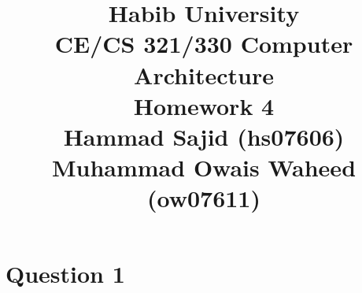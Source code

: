 \documentclass{article}
\title{\textbf{\huge Habib University}\\[0.5cm]
\Large CE/CS 321/330 Computer Architecture\\[0.5cm]
\large Homework 4\\[0.5cm]
\large Hammad Sajid (hs07606)
\\ \large Muhammad Owais Waheed (ow07611)}
\author{}
\date{}
\begin{document}
\maketitle

\section*{Question 1}
\end{document}
